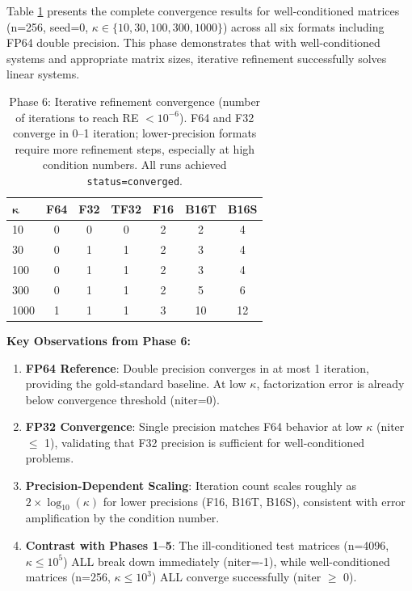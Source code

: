 \documentclass[11pt,a4paper]{article}
\begin{document}
Table \ref{tab:convergence} presents the complete convergence results for well-conditioned matrices (n=256, seed=0, $\kappa \in \{10, 30, 100, 300, 1000\}$) across all six formats including FP64 double precision. This phase demonstrates that with well-conditioned systems and appropriate matrix sizes, iterative refinement successfully solves linear systems.

\begin{table}[!ht]
\centering
\footnotesize
\begin{tabular}{l c c c c c c}
\toprule
$\mathbf{\kappa}$ & F64 & F32 & TF32 & F16 & B16T & B16S \\
\midrule
10 & 0 & 0 & 0 & 2 & 2 & 4 \\
30 & 0 & 1 & 1 & 2 & 3 & 4 \\
100 & 0 & 1 & 1 & 2 & 3 & 4 \\
300 & 0 & 1 & 1 & 2 & 5 & 6 \\
1000 & 1 & 1 & 1 & 3 & 10 & 12 \\
\bottomrule
\end{tabular}
\caption{Phase 6: Iterative refinement convergence (number of iterations to reach RE $< 10^{-6}$). F64 and F32 converge in 0--1 iteration; lower-precision formats require more refinement steps, especially at high condition numbers. All runs achieved \texttt{status=converged}.}
\label{tab:convergence}
\end{table}

\textbf{Key Observations from Phase 6:}
\begin{enumerate}
  \item \textbf{FP64 Reference}: Double precision converges in at most 1 iteration, providing the gold-standard baseline. At low $\kappa$, factorization error is already below convergence threshold (niter=0).
  \item \textbf{FP32 Convergence}: Single precision matches F64 behavior at low $\kappa$ (niter $\leq$ 1), validating that F32 precision is sufficient for well-conditioned problems.
  \item \textbf{Precision-Dependent Scaling}: Iteration count scales roughly as $2 \times \log_{10}(\kappa)$ for lower precisions (F16, B16T, B16S), consistent with error amplification by the condition number.
  \item \textbf{Contrast with Phases 1--5}: The ill-conditioned test matrices (n=4096, $\kappa \leq 10^5$) ALL break down immediately (niter=-1), while well-conditioned matrices (n=256, $\kappa \leq 10^3$) ALL converge successfully (niter $\geq$ 0).
\end{enumerate}
\end{document}
